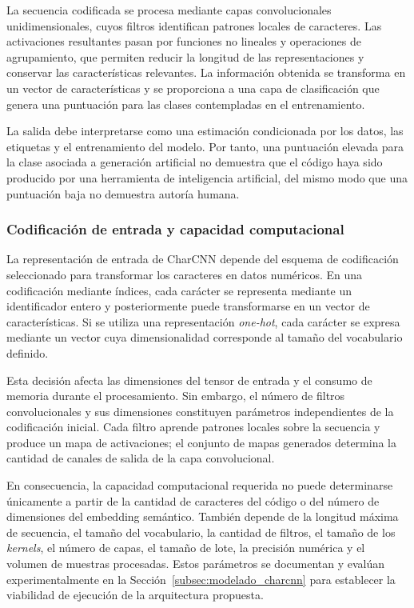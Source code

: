 La secuencia codificada se procesa mediante capas convolucionales unidimensionales, cuyos filtros identifican patrones locales de caracteres. Las activaciones resultantes pasan por funciones no lineales y operaciones de agrupamiento, que permiten reducir la longitud de las representaciones y conservar las características relevantes. La información obtenida se transforma en un vector de características y se proporciona a una capa de clasificación que genera una puntuación para las clases contempladas en el entrenamiento.

La salida debe interpretarse como una estimación condicionada por los datos, las etiquetas y el entrenamiento del modelo. Por tanto, una puntuación elevada para la clase asociada a generación artificial no demuestra que el código haya sido producido por una herramienta de inteligencia artificial, del mismo modo que una puntuación baja no demuestra autoría humana.

\subsubsection{Codificación de entrada y capacidad computacional}

La representación de entrada de CharCNN depende del esquema de codificación seleccionado para transformar los caracteres en datos numéricos. En una codificación mediante índices, cada carácter se representa mediante un identificador entero y posteriormente puede transformarse en un vector de características. Si se utiliza una representación \textit{one-hot}, cada carácter se expresa mediante un vector cuya dimensionalidad corresponde al tamaño del vocabulario definido.

Esta decisión afecta las dimensiones del tensor de entrada y el consumo de memoria durante el procesamiento. Sin embargo, el número de filtros convolucionales y sus dimensiones constituyen parámetros independientes de la codificación inicial. Cada filtro aprende patrones locales sobre la secuencia y produce un mapa de activaciones; el conjunto de mapas generados determina la cantidad de canales de salida de la capa convolucional.

En consecuencia, la capacidad computacional requerida no puede determinarse únicamente a partir de la cantidad de caracteres del código o del número de dimensiones del embedding semántico. También depende de la longitud máxima de secuencia, el tamaño del vocabulario, la cantidad de filtros, el tamaño de los \textit{kernels}, el número de capas, el tamaño de lote, la precisión numérica y el volumen de muestras procesadas. Estos parámetros se documentan y evalúan experimentalmente en la Sección~\ref{subsec:modelado_charcnn} para establecer la viabilidad de ejecución de la arquitectura propuesta.

